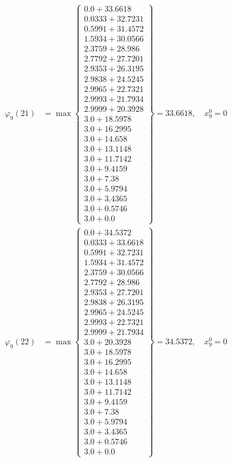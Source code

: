\documentclass{article}
\begin{document}
\begin{align*}
  
  
  
\varphi_{9}(21) &= \max \left\{ \begin{array}{c}
0.0 + 33.6618 \\
 0.0333 + 32.7231 \\
 0.5991 + 31.4572 \\
 1.5934 + 30.0566 \\
 2.3759 + 28.986 \\
 2.7792 + 27.7201 \\
 2.9353 + 26.3195 \\
 2.9838 + 24.5245 \\
 2.9965 + 22.7321 \\
 2.9993 + 21.7934 \\
 2.9999 + 20.3928 \\
 3.0 + 18.5978 \\
 3.0 + 16.2995 \\
 3.0 + 14.658 \\
 3.0 + 13.1148 \\
 3.0 + 11.7142 \\
 3.0 + 9.4159 \\
 3.0 + 7.38 \\
 3.0 + 5.9794 \\
 3.0 + 3.4365 \\
 3.0 + 0.5746 \\
 3.0 + 0.0
\end{array} \right\}=33.6618,\quad x_{9}^0=0\\
  
  
  
  
\varphi_{9}(22) &= \max \left\{ \begin{array}{c}
0.0 + 34.5372 \\
 0.0333 + 33.6618 \\
 0.5991 + 32.7231 \\
 1.5934 + 31.4572 \\
 2.3759 + 30.0566 \\
 2.7792 + 28.986 \\
 2.9353 + 27.7201 \\
 2.9838 + 26.3195 \\
 2.9965 + 24.5245 \\
 2.9993 + 22.7321 \\
 2.9999 + 21.7934 \\
 3.0 + 20.3928 \\
 3.0 + 18.5978 \\
 3.0 + 16.2995 \\
 3.0 + 14.658 \\
 3.0 + 13.1148 \\
 3.0 + 11.7142 \\
 3.0 + 9.4159 \\
 3.0 + 7.38 \\
 3.0 + 5.9794 \\
 3.0 + 3.4365 \\
 3.0 + 0.5746 \\
 3.0 + 0.0
\end{array} \right\}=34.5372,\quad x_{9}^0=0\\
  

\end{align*}
\end{document}
